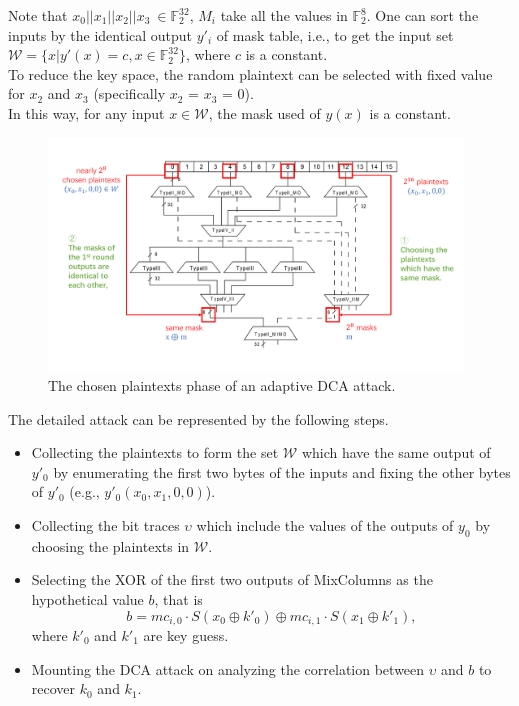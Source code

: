 \documentclass{beamer}
\begin{document}
\frame
{
	Note that $x_0||x_1||x_2||x_3\ \in \mathbb{F}_{2}^{32}$, $M_i$ take all the values in $\mathbb{F}_{2}^{8}$. One can sort the inputs by the identical output $y'_i$ of mask table, i.e., to get the input set $\mathcal{W}=\{x|y'(x)=c,x\in\mathbb{F}_{2}^{32}\}$, where $c$ is a constant.
	\\[2ex]
	To reduce the key space, the random plaintext can be selected with fixed value for $x_2$ and $x_3$ (specifically $x_2$ = $x_3$ = 0).
	\\[2ex]
	In this way, for any input $x\in \mathcal{W}$, the mask used of $y(x)$ is a constant.
	
}

\frame
{
	\begin{figure}
		\centering
		\includegraphics[width=11cm]{./pics/DCA_R12_2.pdf}
		\caption{The chosen plaintexts phase of an adaptive DCA attack.}
	\end{figure}
}

\frame
{
	The detailed attack can be represented by the following steps.
	\begin{itemize}	
		\item Collecting the plaintexts to form the set $\mathcal{W}$ which have the same output of $y'_0$ by enumerating the first two bytes of the inputs and fixing the other bytes of $y'_0$ (e.g., $y'_0(x_0,x_1,0,0)$).
		\item Collecting the bit traces $\upsilon$ which include the values of the outputs of $y_0$ by choosing the plaintexts in $\mathcal{W}$.
	\end{itemize}
}

\frame
{
	\begin{itemize}
		\item Selecting the XOR of the first two outputs of MixColumns as the hypothetical value $b$, that is
		\begin{displaymath}
		b=mc_{i,0}\cdot S(x_0\oplus k'_0)\oplus mc_{i,1}\cdot S(x_1\oplus k'_1),
		\end{displaymath}
		where $k'_0$ and $k'_1$ are key guess.
		\item Mounting the DCA attack on analyzing the correlation between $\upsilon$ and $b$ to recover $k_0$ and $k_1$.
	\end{itemize}
}
\end{document}
